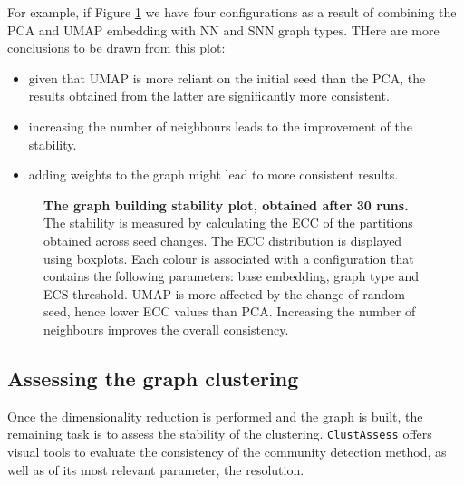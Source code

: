 For example, if Figure \ref{fig:ca-nn-ecc} we have four configurations as a result of combining the PCA and UMAP embedding with NN and SNN graph types. THere are more conclusions to be drawn from this plot:
\begin{itemize}
    \item given that UMAP is more reliant on the initial seed than the PCA, the results obtained from the latter are significantly more consistent.
    \item increasing the number of neighbours leads to the improvement of the stability.
    \item adding weights to the graph might lead to more consistent results.
\end{itemize}
\begin{figure}[H]
    \centering
    \caption{\label{fig:ca-nn-ecc}\textbf{The graph building stability plot, obtained after 30 runs.} The stability is measured by calculating the ECC of the partitions obtained across seed changes. The ECC distribution is displayed using boxplots. Each colour is associated with a configuration that contains the following parameters: base embedding, graph type and ECS threshold. UMAP is more affected by the change of random seed, hence lower ECC values than PCA. Increasing the number of neighbours improves the overall consistency. }
\end{figure}

\subsection{Assessing the graph clustering}
Once the dimensionality reduction is performed and the graph is built, the remaining task is to assess the stability of the clustering. \verb|ClustAssess| offers visual tools to evaluate the consistency of the community detection method, as well as of its most relevant parameter, the resolution.

